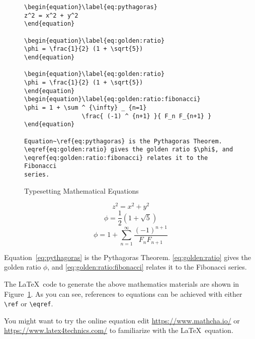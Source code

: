 \begin{figure}[htb!]
\begin{lstlisting}
\begin{equation}\label{eq:pythagoras}
z^2 = x^2 + y^2
\end{equation}

\begin{equation}\label{eq:golden:ratio}
\phi = \frac{1}{2} (1 + \sqrt{5})
\end{equation}

\begin{equation}\label{eq:golden:ratio}
\phi = \frac{1}{2} (1 + \sqrt{5})
\end{equation}
\begin{equation}\label{eq:golden:ratio:fibonacci}
\phi = 1 + \sum ^ {\infty} _ {n=1}
                \frac{ (-1) ^ {n+1} }{ F_n F_{n+1} }
\end{equation}

Equation~\ref{eq:pythagoras} is the Pythagoras Theorem. 
\eqref{eq:golden:ratio} gives the golden ratio $\phi$, and 
\eqref{eq:golden:ratio:fibonacci} relates it to the Fibonacci 
series.
\end{lstlisting}
\caption{Typesetting Mathematical Equations}\label{fig:lst:equation}
\end{figure}

\begin{equation}\label{eq:pythagoras}
z^2 = x^2 + y^2
\end{equation}
\begin{equation}\label{eq:golden:ratio}
\phi = \frac{1}{2} (1 + \sqrt{5})
\end{equation}
\begin{equation}\label{eq:golden:ratio:fibonacci}
\phi = 1 + \sum ^ {\infty} _ {n=1}
                \frac{ (-1) ^ {n+1} }{ F_n F_{n+1} }
\end{equation}

Equation~\ref{eq:pythagoras} is the Pythagoras Theorem. \eqref{eq:golden:ratio} gives the golden ratio $\phi$, and \eqref{eq:golden:ratio:fibonacci} relates it to the Fibonacci series.

The \LaTeX\ code to generate the above mathematics materials are shown in Figure~\ref{fig:lst:equation}.  As you can see, references to equations can be achieved with either \verb|\ref| or \verb|\eqref|. 

You might want to try the online equation edit \url{https://www.mathcha.io/} or \url{https://www.latex4technics.com/} to familiarize with the \LaTeX\ equation. 

